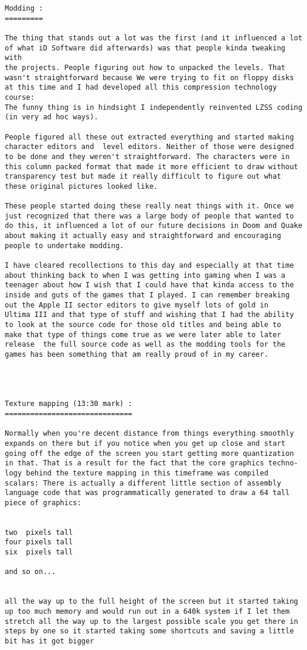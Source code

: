 \documentclass[book.tex]{subfiles}
\begin{document}
\begin{lstlisting}[breaklines=true,breakindent=0em]
Modding :
=========

The thing that stands out a lot was the first (and it influenced a lot
of what iD Software did afterwards) was that people kinda tweaking with
the projects. People figuring out how to unpacked the levels. That 
wasn't straightforward because We were trying to fit on floppy disks 
at this time and I had developed all this compression technology course:
The funny thing is in hindsight I independently reinvented LZSS coding 
(in very ad hoc ways). 

People figured all these out extracted everything and started making 
character editors and  level editors. Neither of those were designed 
to be done and they weren't straightforward. The characters were in 
this column packed format that made it more efficient to draw without 
transparency test but made it really difficult to figure out what 
these original pictures looked like. 

These people started doing these really neat things with it. Once we 
just recognized that there was a large body of people that wanted to 
do this, it influenced a lot of our future decisions in Doom and Quake 
about making it actually easy and straightforward and encouraging 
people to undertake modding.

I have cleared recollections to this day and especially at that time 
about thinking back to when I was getting into gaming when I was a 
teenager about how I wish that I could have that kinda access to the 
inside and guts of the games that I played. I can remember breaking 
out the Apple II sector editors to give myself lots of gold in 
Ultima III and that type of stuff and wishing that I had the ability 
to look at the source code for those old titles and being able to 
make that type of things come true as we were later able to later 
release  the full source code as well as the modding tools for the 
games has been something that am really proud of in my career.




Texture mapping (13:30 mark) :
==============================

Normally when you're decent distance from things everything smoothly 
expands on there but if you notice when you get up close and start 
going off the edge of the screen you start getting more quantization 
in that. That is a result for the fact that the core graphics techno-
logy behind the texture mapping in this timeframe was compiled 
scalars: There is actually a different little section of assembly 
language code that was programmatically generated to draw a 64 tall 
piece of graphics:


two  pixels tall 
four pixels tall 
six  pixels tall

and so on...


all the way up to the full height of the screen but it started taking 
up too much memory and would run out in a 640k system if I let them 
stretch all the way up to the largest possible scale you get there in 
steps by one so it started taking some shortcuts and saving a little 
bit has it got bigger
   
\end{lstlisting}
\end{document}

